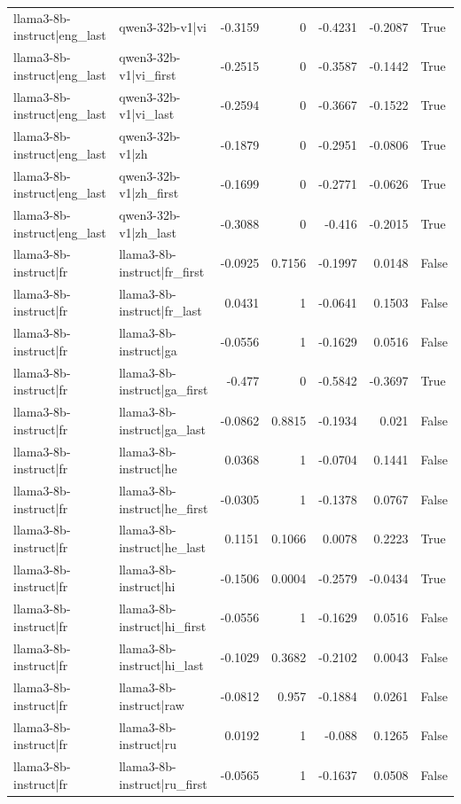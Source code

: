 \begin{table}
\begin{tabular}{l l r r r r l}
llama3-8b-instruct|eng_last & qwen3-32b-v1|vi & -0.3159 & 0 & -0.4231 & -0.2087 & True \\
llama3-8b-instruct|eng_last & qwen3-32b-v1|vi_first & -0.2515 & 0 & -0.3587 & -0.1442 & True \\
llama3-8b-instruct|eng_last & qwen3-32b-v1|vi_last & -0.2594 & 0 & -0.3667 & -0.1522 & True \\
llama3-8b-instruct|eng_last & qwen3-32b-v1|zh & -0.1879 & 0 & -0.2951 & -0.0806 & True \\
llama3-8b-instruct|eng_last & qwen3-32b-v1|zh_first & -0.1699 & 0 & -0.2771 & -0.0626 & True \\
llama3-8b-instruct|eng_last & qwen3-32b-v1|zh_last & -0.3088 & 0 & -0.416 & -0.2015 & True \\
llama3-8b-instruct|fr & llama3-8b-instruct|fr_first & -0.0925 & 0.7156 & -0.1997 & 0.0148 & False \\
llama3-8b-instruct|fr & llama3-8b-instruct|fr_last & 0.0431 & 1 & -0.0641 & 0.1503 & False \\
llama3-8b-instruct|fr & llama3-8b-instruct|ga & -0.0556 & 1 & -0.1629 & 0.0516 & False \\
llama3-8b-instruct|fr & llama3-8b-instruct|ga_first & -0.477 & 0 & -0.5842 & -0.3697 & True \\
llama3-8b-instruct|fr & llama3-8b-instruct|ga_last & -0.0862 & 0.8815 & -0.1934 & 0.021 & False \\
llama3-8b-instruct|fr & llama3-8b-instruct|he & 0.0368 & 1 & -0.0704 & 0.1441 & False \\
llama3-8b-instruct|fr & llama3-8b-instruct|he_first & -0.0305 & 1 & -0.1378 & 0.0767 & False \\
llama3-8b-instruct|fr & llama3-8b-instruct|he_last & 0.1151 & 0.1066 & 0.0078 & 0.2223 & True \\
llama3-8b-instruct|fr & llama3-8b-instruct|hi & -0.1506 & 0.0004 & -0.2579 & -0.0434 & True \\
llama3-8b-instruct|fr & llama3-8b-instruct|hi_first & -0.0556 & 1 & -0.1629 & 0.0516 & False \\
llama3-8b-instruct|fr & llama3-8b-instruct|hi_last & -0.1029 & 0.3682 & -0.2102 & 0.0043 & False \\
llama3-8b-instruct|fr & llama3-8b-instruct|raw & -0.0812 & 0.957 & -0.1884 & 0.0261 & False \\
llama3-8b-instruct|fr & llama3-8b-instruct|ru & 0.0192 & 1 & -0.088 & 0.1265 & False \\
llama3-8b-instruct|fr & llama3-8b-instruct|ru_first & -0.0565 & 1 & -0.1637 & 0.0508 & False \\

\end{tabular}
\end{table}
